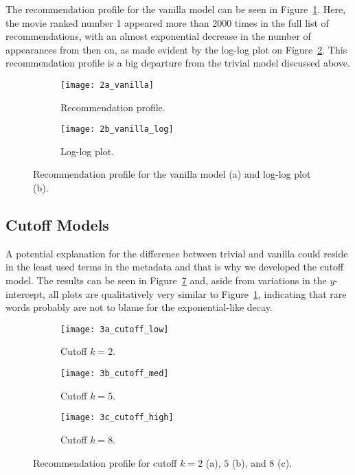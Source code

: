 The recommendation profile for the vanilla model can be seen in
Figure~\ref{fig:fig2a}. Here, the movie ranked number 1 appeared more than 2000
times in the full list of recommendations, with an almost exponential decrease
in the number of appearances from then on, as made evident by the log-log plot
on Figure~\ref{fig:fig2b}. This recommendation profile is a big departure from
the trivial model discussed above.

\begin{figure}
  \centering
  \begin{subfigure}{0.45\textwidth}
    \centering
    \texttt{[image: 2a\_vanilla]}
    \caption{Recommendation profile.\label{fig:fig2a}}
  \end{subfigure}
  \begin{subfigure}{0.45\textwidth}
    \centering
    \texttt{[image: 2b\_vanilla\_log]}
    \caption{Log-log plot.\label{fig:fig2b}}
  \end{subfigure}
  \caption{Recommendation profile for the vanilla model (a) and log-log plot
    (b).\label{fig:fig2}}
\end{figure}

\subsection{Cutoff Models}
\label{subsec:cutoff}

A potential explanation for the difference between trivial and vanilla could
reside in the least used terms in the metadata and that is why we developed the
cutoff model. The results can be seen in Figure~\ref{fig:fig3} and, aside from
variations in the $y$-intercept, all plots are qualitatively very similar to
Figure~\ref{fig:fig2a}, indicating that rare words probably are not to blame for
the exponential-like decay.

\begin{figure}
  \centering
  \begin{subfigure}{0.3\textwidth}
    \centering
    \texttt{[image: 3a\_cutoff\_low]}
    \caption{Cutoff $k = 2$.\label{fig:fig3a}}
  \end{subfigure}
  \begin{subfigure}{0.3\textwidth}
    \centering
    \texttt{[image: 3b\_cutoff\_med]}
    \caption{Cutoff $k = 5$.\label{fig:fig3b}}
  \end{subfigure}
  \begin{subfigure}{0.3\textwidth}
    \centering
    \texttt{[image: 3c\_cutoff\_high]}
    \caption{Cutoff $k = 8$.\label{fig:fig3c}}
  \end{subfigure}
  \caption{Recommendation profile for cutoff $k = 2$ (a), $5$ (b), and $8$
    (c).\label{fig:fig3}}
\end{figure}

